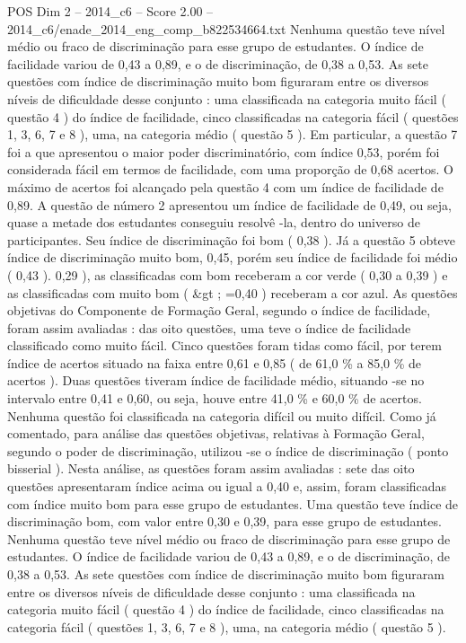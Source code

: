 \begin{textsample}{POS Dim 2 – 2014\_c6 – Score 2.00 – 2014\_c6/enade\_2014\_eng\_comp\_b822534664.txt}
Nenhuma questão teve nível médio ou fraco de discriminação para esse grupo de estudantes.
O índice de facilidade variou de 0,43 a 0,89, e o de discriminação, de 0,38 a 0,53.
As sete questões com índice de discriminação muito bom figuraram entre os diversos níveis de dificuldade desse conjunto : uma classificada na categoria muito fácil ( questão 4 ) do índice de facilidade, cinco classificadas na categoria fácil ( questões 1, 3, 6, 7 e 8 ), uma, na categoria médio ( questão 5 ).
Em particular, a questão 7 foi a que apresentou o maior poder discriminatório, com índice 0,53, porém foi considerada fácil em termos de facilidade, com uma proporção de 0,68 acertos.
O máximo de acertos foi alcançado pela questão 4 com um índice de facilidade de 0,89.
A questão de número 2 apresentou um índice de facilidade de 0,49, ou seja, quase a metade dos estudantes conseguiu resolvê -la, dentro do universo de participantes.
Seu índice de discriminação foi bom ( 0,38 ).
Já a questão 5 obteve índice de discriminação muito bom, 0,45, porém seu índice de facilidade foi médio ( 0,43 ). 0,29 ), as classificadas com bom receberam a cor verde ( 0,30 a 0,39 ) e as classificadas com muito bom ( \&gt ; =0,40 ) receberam a cor azul.
As questões objetivas do Componente de Formação Geral, segundo o índice de facilidade, foram assim avaliadas : das oito questões, uma teve o índice de facilidade classificado como muito fácil.
Cinco questões foram tidas como fácil, por terem índice de acertos situado na faixa entre 0,61 e 0,85 ( de 61,0 \% a 85,0 \% de acertos ).
Duas questões tiveram índice de facilidade médio, situando -se no intervalo entre 0,41 e 0,60, ou seja, houve entre 41,0 \% e 60,0 \% de acertos.
Nenhuma questão foi classificada na categoria difícil ou muito difícil.
Como já comentado, para análise das questões objetivas, relativas à Formação Geral, segundo o poder de discriminação, utilizou -se o índice de discriminação ( ponto bisserial ).
Nesta análise, as questões foram assim avaliadas : sete das oito questões apresentaram índice acima ou igual a 0,40 e, assim, foram classificadas com índice muito bom para esse grupo de estudantes.
Uma questão teve índice de discriminação bom, com valor entre 0,30 e 0,39, para esse grupo de estudantes.
Nenhuma questão teve nível médio ou fraco de discriminação para esse grupo de estudantes.
O índice de facilidade variou de 0,43 a 0,89, e o de discriminação, de 0,38 a 0,53.
As sete questões com índice de discriminação muito bom figuraram entre os diversos níveis de dificuldade desse conjunto : uma classificada na categoria muito fácil ( questão 4 ) do índice de facilidade, cinco classificadas na categoria fácil ( questões 1, 3, 6, 7 e 8 ), uma, na categoria médio ( questão 5 ).

\end{textsample}
